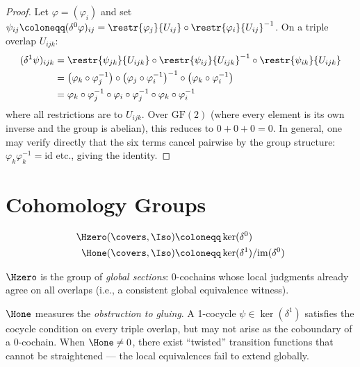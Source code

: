 \begin{proof}
Let $\varphi = (\varphi_i)$ and set $\psi_{ij} \coloneqq (\delta^0\varphi)_{ij}
= \restr{\varphi_j}{U_{ij}} \circ \restr{\varphi_i}{U_{ij}}^{-1}$.
On a triple overlap $U_{ijk}$:
\begin{align*}
  (\delta^1\psi)_{ijk}
  &= \restr{\psi_{jk}}{U_{ijk}} \circ \restr{\psi_{ij}}{U_{ijk}}^{-1}
     \circ \restr{\psi_{ik}}{U_{ijk}} \\
  &= \bigl(\varphi_k \circ \varphi_j^{-1}\bigr) \circ
     \bigl(\varphi_j \circ \varphi_i^{-1}\bigr)^{-1} \circ
     \bigl(\varphi_k \circ \varphi_i^{-1}\bigr) \\
  &= \varphi_k \circ \varphi_j^{-1} \circ \varphi_i \circ \varphi_j^{-1}
     \circ \varphi_k \circ \varphi_i^{-1}
\end{align*}
where all restrictions are to $U_{ijk}$.  Over $\mathrm{GF}(2)$ (where
every element is its own inverse and the group is abelian), this reduces
to $0 + 0 + 0 = 0$.  In general, one may verify directly that the
six terms cancel pairwise by the group structure: $\varphi_k \varphi_k^{-1} =
\mathrm{id}$ etc., giving the identity.
\end{proof}

\section{Cohomology Groups}

\begin{definition}
\label{def:cech-cohomology}
\begin{align}
  \Hzero(\covers, \Iso) &\coloneqq \ker(\delta^0) \\
  \Hone(\covers, \Iso) &\coloneqq \ker(\delta^1) / \mathrm{im}(\delta^0)
\end{align}
\end{definition}

\begin{remark}
\label{rem:h0h1-meaning}
$\Hzero$ is the group of \emph{global sections}: 0-cochains whose local
judgments already agree on all overlaps (i.e., a consistent global
equivalence witness).

$\Hone$ measures the \emph{obstruction to gluing}.  A 1-cocycle
$\psi \in \ker(\delta^1)$ satisfies the cocycle condition on every
triple overlap, but may not arise as the coboundary of a 0-cochain.
When $\Hone \neq 0$, there exist ``twisted'' transition functions
that cannot be straightened --- the local equivalences fail to extend
globally.
\end{remark}

